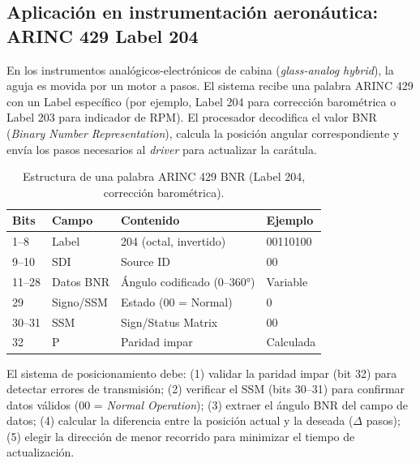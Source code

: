 \documentclass[11pt]{article}
\begin{document}
\subsection{Aplicación en instrumentación aeronáutica: ARINC 429 Label 204}
En los instrumentos analógicos-electrónicos de cabina (\emph{glass-analog hybrid}), la
aguja es movida por un motor a pasos. El sistema recibe una palabra ARINC 429 con un
Label específico (por ejemplo, Label 204 para corrección barométrica o Label 203 para
indicador de RPM). El procesador decodifica el valor BNR (\emph{Binary Number
Representation}), calcula la posición angular correspondiente y envía los pasos
necesarios al \emph{driver} para actualizar la carátula.
\begin{table}[H]\centering
\caption{Estructura de una palabra ARINC 429 BNR (Label 204, corrección barométrica).}
\begin{tabular}{llll}
\toprule
Bits & Campo & Contenido & Ejemplo \\
\midrule
1--8 & Label & 204 (octal, invertido) & 00110100 \\
9--10 & SDI & Source ID & 00 \\
11--28 & Datos BNR & Ángulo codificado ($0$--$360\si{\degree}$) & Variable \\
29 & Signo/SSM & Estado (00 = Normal) & 0 \\
30--31 & SSM & Sign/Status Matrix & 00 \\
32 & P & Paridad impar & Calculada \\
\bottomrule
\end{tabular}
\end{table}
El sistema de posicionamiento debe: (1) validar la paridad impar (bit 32) para detectar
errores de transmisión; (2) verificar el SSM (bits 30--31) para confirmar datos válidos
(00 = \emph{Normal Operation}); (3) extraer el ángulo BNR del campo de datos; (4)
calcular la diferencia entre la posición actual y la deseada ($\Delta$ pasos); (5) elegir
la dirección de menor recorrido para minimizar el tiempo de actualización.

\end{document}

